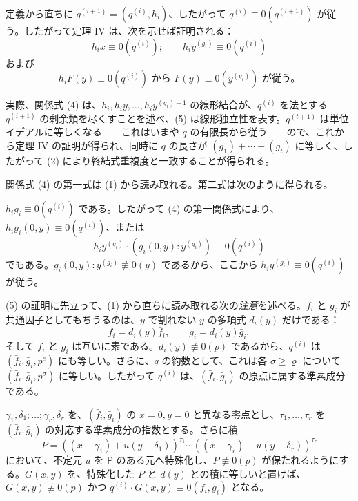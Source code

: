 定義から直ちに \(q^{(i+1)}=(q^{(i)},h_i)\)、したがって \(q^{(i)}\equiv0(q^{(i+1)})\) が従う。したがって定理 IV は、次を示せば証明される：
\begin{equation}
\tag{4}
h_i x\equiv0(q^{(i)});\qquad
h_i y^{(g_i)}\equiv0(q^{(i)})
\end{equation}
および
\begin{equation}
\tag{5}
 h_iF(y)\equiv0(q^{(i)})
 \text{ から }F(y)\equiv0(y^{(g_i)})\text{ が従う。}
\end{equation}

実際、関係式 (4) は、\(h_i,h_iy,\ldots,h_iy^{(g_i)-1}\) の線形結合が、\(q^{(i)}\) を法とする \(q^{(i+1)}\) の剰余類を尽くすことを述べ、(5) は線形独立性を表す。\(q^{(t+1)}\) は単位イデアルに等しくなる――これはいまや \(q\) の有限長から従う――ので、これから定理 IV の証明が得られ、同時に \(q\) の長さが \((g_1)+\cdots+(g_t)\) に等しく、したがって (2) により終結式重複度と一致することが得られる。

関係式 (4) の第一式は (1) から読み取れる。第二式は次のように得られる。

\(h_ig_i\equiv0(q^{(i)})\) である。したがって (4) の第一関係式により、\(h_ig_i(0,y)\equiv0(q^{(i)})\)、または
\[
h_iy^{(g_i)}\cdot(g_i(0,y):y^{(g_i)})\equiv0(q^{(i)})
\]
でもある。\(g_i(0,y):y^{(g_i)}\not\equiv0(y)\) であるから、ここから \(h_iy^{(g_i)}\equiv0(q^{(i)})\) が従う。

(5) の証明に先立って、(1) から直ちに読み取れる次の\emph{注意}を述べる。\(f_i\) と \(g_i\) が共通因子としてもちうるのは、\(y\) で割れない \(y\) の多項式 \(d_i(y)\) だけである：
\[
f_i=d_i(y)\bar f_i,\qquad g_i=d_i(y)\bar g_i,
\]
そして \(\bar f_i\) と \(\bar g_i\) は互いに素である。\(d_i(y)\not\equiv0(p)\) であるから、\(q^{(i)}\) は \((\bar f_i,\bar g_i,p^e)\) にも等しい。さらに、\(q\) の約数として、これは各 \(\sigma\geq\varrho\) について \((\bar f_i,\bar g_i,p^\sigma)\) に等しい。したがって \(q^{(i)}\) は、\((\bar f_i,\bar g_i)\) の原点に属する準素成分である。

\(\gamma_1,\delta_1;\ldots;\gamma_r,\delta_r\) を、\((\bar f_i,\bar g_i)\) の \(x=0, y=0\) と異なる零点とし、\(\tau_1,\ldots,\tau_r\) を \((\bar f_i,\bar g_i)\) の対応する準素成分の指数とする。さらに積
\[
P=((x-\gamma_1)+u(y-\delta_1))^{\tau_1}\cdots
((x-\gamma_r)+u(y-\delta_r))^{\tau_r}
\]
において、不定元 \(u\) を \(\mathsf P\) のある元へ特殊化し、\(P\not\equiv0(p)\) が保たれるようにする。\(G(x,y)\) を、特殊化した \(P\) と \(d(y)\) との積に等しいと置けば、\(G(x,y)\not\equiv0(p)\) かつ \(q^{(i)}\cdot G(x,y)\equiv0(f_i,g_i)\) となる。

